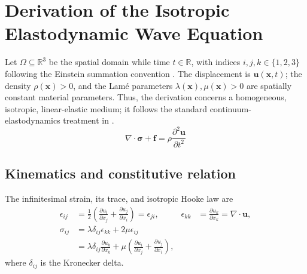 
\section*{Derivation of the Isotropic Elastodynamic Wave Equation}
\label{sec:supp_derivation_wave_equation}

Let $\Omega \subseteq \mathbb{R}^{3}$ be the spatial domain while time
$t \in \mathbb{R}$, with indices $i,j,k\in\{1,2,3\}$ following the Einstein
summation convention . The displacement is
$\mathbf{u}(\mathbf{x},t)$; the density $\rho(\mathbf{x}) > 0$, and the Lamé
parameters $\lambda(\mathbf{x}), \mu(\mathbf{x}) > 0$ are spatially constant
material parameters. Thus, the derivation concerns a homogeneous, isotropic,
linear-elastic medium; it follows the standard continuum-elastodynamics
treatment in \textcite{AkiRichards1980}.
\begin{equation}
  \nabla \cdot \boldsymbol{\sigma} + \mathbf{f} = \rho
  \frac{\partial^2 \mathbf{u}}{\partial t^2}
  \label{eq:supp_cauchy_momentum}
\end{equation}

\subsection*{Kinematics and constitutive relation}

The infinitesimal strain, its trace, and isotropic Hooke law are
\begin{equation*}
  \begin{aligned}
    \epsilon_{ij}
    & = \frac{1}{2}\left(\frac{\partial u_i}{\partial x_j}
    + \frac{\partial u_j}{\partial x_i}\right) = \epsilon_{ji},
    & \epsilon_{kk} & = \frac{\partial u_k}{\partial x_k}
    = \nabla \cdot \mathbf{u}, \\
    \sigma_{ij} & = \lambda\delta_{ij}\epsilon_{kk} + 2\mu\epsilon_{ij} \\
    & = \lambda\delta_{ij}\frac{\partial u_k}{\partial x_k}
    + \mu\left(\frac{\partial u_i}{\partial x_j}
    + \frac{\partial u_j}{\partial x_i}\right),
  \end{aligned}
\end{equation*}
where $\delta_{ij}$ is the Kronecker delta.

